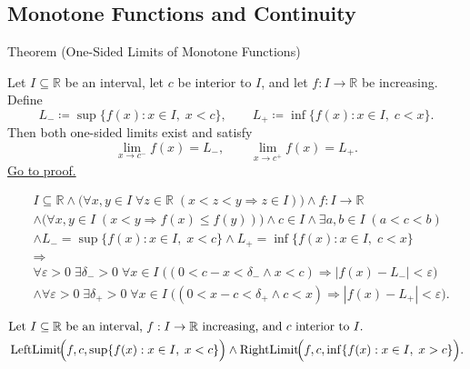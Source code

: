 
\subsection*{Monotone Functions and Continuity}
\label{sec:monotone-functions}
\begin{theorembox}{Theorem (One-Sided Limits of Monotone Functions)}
\begin{theorem}
\label{thm:monotone-one-sided-limits}
Let $I \subseteq \mathbb{R}$ be an interval, let $c$ be interior to $I$, and let $f:I\to\mathbb{R}$ be increasing. Define
\[
L_- \coloneqq \sup\{f(x): x\in I,\; x<c\},
\qquad
L_+ \coloneqq \inf\{f(x): x\in I,\; c<x\}.
\]
Then both one-sided limits exist and satisfy
\[
\lim_{x\to c^-} f(x) = L_-,
\qquad
\lim_{x\to c^+} f(x) = L_+.
\]
\hyperref[prf:monotone-one-sided-limits]{Go to proof.}
\end{theorem}
\end{theorembox}

\begin{remark*}
\[
\begin{aligned}
&I\subseteq\mathbb{R}\land
\bigl(\forall x,y\in I\;\forall z\in\mathbb{R}\;(x<z<y\Rightarrow z\in I)\bigr)
\land f:I\to\mathbb{R}\\
&\land\bigl(\forall x,y\in I\;(x<y\Rightarrow f(x)\le f(y))\bigr)
\land c\in I
\land \exists a,b\in I\;(a<c<b)\\
&\land L_- = \sup\{f(x): x\in I,\; x<c\}
\land L_+ = \inf\{f(x): x\in I,\; c<x\}\\
&\Longrightarrow\\
&\forall \varepsilon>0\; \exists \delta_- > 0\; \forall x\in I\; \bigl((0<c-x<\delta_- \land x<c) \Rightarrow |f(x)-L_-|<\varepsilon \bigr)\\
&\land \forall \varepsilon>0\; \exists \delta_+ > 0\; \forall x\in I\; \bigl((0<x-c<\delta_+ \land c<x) \Rightarrow |f(x)-L_+|<\varepsilon \bigr).
\end{aligned}
\]
\end{remark*}

\begin{remark*}
\[
\begin{aligned}
&\text{Let } I\subseteq \mathbb{R} \text{ be an interval, } f:I\to\mathbb{R} \text{ increasing, and } c \text{ interior to } I.\\
&\operatorname{LeftLimit}\!\Bigl(f,c,\sup\{f(x): x\in I,\; x<c\}\Bigr)
\land
\operatorname{RightLimit}\!\Bigl(f,c,\inf\{f(x): x\in I,\; x>c\}\Bigr).
\end{aligned}
\]
\end{remark*}


